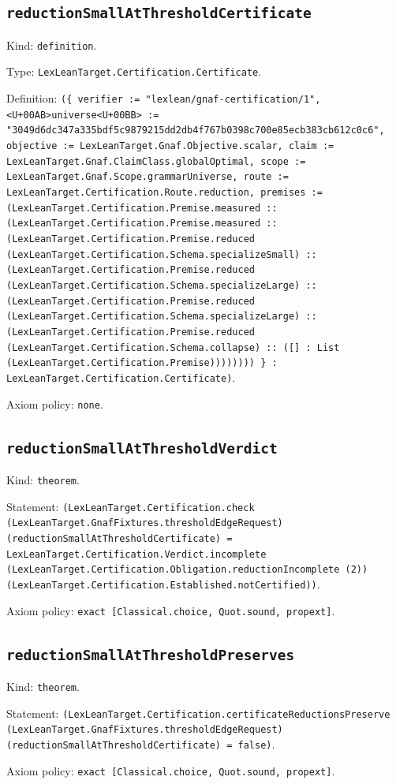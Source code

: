 \documentclass[11pt]{article}
\begin{document}
\subsection*{\texttt{reductionSmallAtThresholdCertificate}}
\noindent Kind: \texttt{definition}.\par
\noindent Type: \texttt{LexLeanTarget.Certification.Certificate}.\par
\noindent Definition: \texttt{(\{ verifier := "lexlean/gnaf-certification/1", <U+00AB>universe<U+00BB> := "3049d6dc347a335bdf5c9879215dd2db4f767b0398c700e85ecb383cb612c0c6", objective := LexLeanTarget.Gnaf.Objective.scalar, claim := LexLeanTarget.Gnaf.ClaimClass.globalOptimal, scope := LexLeanTarget.Gnaf.Scope.grammarUniverse, route := LexLeanTarget.Certification.Route.reduction, premises := (LexLeanTarget.Certification.Premise.measured :: (LexLeanTarget.Certification.Premise.measured :: (LexLeanTarget.Certification.Premise.reduced (LexLeanTarget.Certification.Schema.specializeSmall) :: (LexLeanTarget.Certification.Premise.reduced (LexLeanTarget.Certification.Schema.specializeLarge) :: (LexLeanTarget.Certification.Premise.reduced (LexLeanTarget.Certification.Schema.specializeLarge) :: (LexLeanTarget.Certification.Premise.reduced (LexLeanTarget.Certification.Schema.collapse) :: ([] : List (LexLeanTarget.Certification.Premise)))))))) \} : LexLeanTarget.Certification.Certificate)}.\par
\noindent Axiom policy: \texttt{none}.\par
\subsection*{\texttt{reductionSmallAtThresholdVerdict}}
\noindent Kind: \texttt{theorem}.\par
\noindent Statement: \texttt{(LexLeanTarget.Certification.check (LexLeanTarget.GnafFixtures.thresholdEdgeRequest) (reductionSmallAtThresholdCertificate) = LexLeanTarget.Certification.Verdict.incomplete (LexLeanTarget.Certification.Obligation.reductionIncomplete (2)) (LexLeanTarget.Certification.Established.notCertified))}.\par
\noindent Axiom policy: \texttt{exact [Classical.choice, Quot.sound, propext]}.\par
\subsection*{\texttt{reductionSmallAtThresholdPreserves}}
\noindent Kind: \texttt{theorem}.\par
\noindent Statement: \texttt{(LexLeanTarget.Certification.certificateReductionsPreserve (LexLeanTarget.GnafFixtures.thresholdEdgeRequest) (reductionSmallAtThresholdCertificate) = false)}.\par
\noindent Axiom policy: \texttt{exact [Classical.choice, Quot.sound, propext]}.\par
\end{document}
